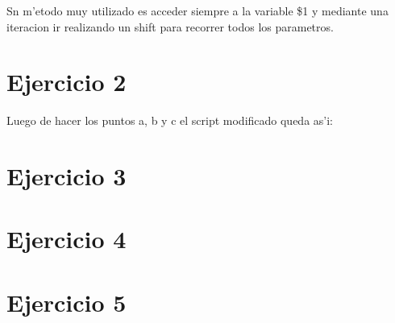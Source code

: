 \documentclass[a4paper,11pt]{article}
\newcommand{\?}{?`}
\begin{document}
Sn m'etodo muy utilizado es acceder siempre a la variable \$1 y mediante una iteracion ir realizando 
un shift para recorrer todos los parametros.

\section{Ejercicio 2}

Luego de hacer los puntos a, b y c el script modificado queda as'i:



\section{Ejercicio 3}



\section{Ejercicio 4}



\section{Ejercicio 5}


\end{document}
